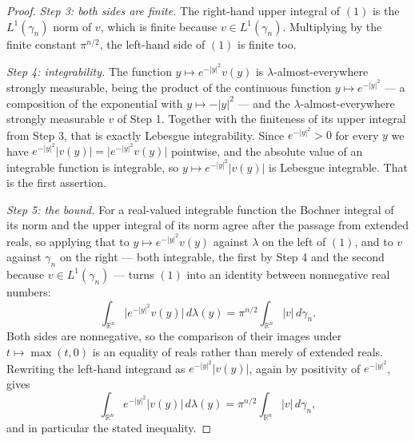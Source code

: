 \begin{proof}
\emph{Step 3: both sides are finite.}
The right-hand upper integral of $(1)$ is the $L^1(\gamma_n)$ norm of $v$, which
is finite because $v \in L^1(\gamma_n)$.  Multiplying by the finite constant
$\pi^{n/2}$, the left-hand side of $(1)$ is finite too.

\emph{Step 4: integrability.}
The function $y \mapsto e^{-|y|^2}v(y)$ is $\lambda$-almost-everywhere strongly
measurable, being the product of the continuous function $y \mapsto e^{-|y|^2}$
--- a composition of the exponential with $y \mapsto -|y|^2$ --- and the
$\lambda$-almost-everywhere strongly measurable $v$ of Step 1.  Together with the
finiteness of its upper integral from Step 3, that is exactly Lebesgue
integrability.  Since $e^{-|y|^2} > 0$ for every $y$ we have
$e^{-|y|^2}|v(y)| = \bigl|e^{-|y|^2}v(y)\bigr|$ pointwise, and the absolute value
of an integrable function is integrable, so $y \mapsto e^{-|y|^2}|v(y)|$ is
Lebesgue integrable.  That is the first assertion.

\emph{Step 5: the bound.}
For a real-valued integrable function the Bochner integral of its norm and the
upper integral of its norm agree after the passage from extended reals, so
applying that to $y \mapsto e^{-|y|^2}v(y)$ against $\lambda$ on the left of
$(1)$, and to $v$ against $\gamma_n$ on the right --- both integrable, the first
by Step 4 and the second because $v \in L^1(\gamma_n)$ --- turns $(1)$ into an
identity between nonnegative real numbers:
\[
  \int_{\mathbb{R}^n}\bigl|e^{-|y|^2}v(y)\bigr|\,d\lambda(y)
    = \pi^{n/2}\int_{\mathbb{R}^n}|v|\,d\gamma_n .
\]
Both sides are nonnegative, so the comparison of their images under
$t \mapsto \max(t,0)$ is an equality of reals rather than merely of extended
reals.  Rewriting the left-hand integrand as $e^{-|y|^2}|v(y)|$, again by
positivity of $e^{-|y|^2}$, gives
\[
  \int_{\mathbb{R}^n} e^{-|y|^2}|v(y)|\,d\lambda(y)
    = \pi^{n/2}\int_{\mathbb{R}^n}|v|\,d\gamma_n ,
\]
and in particular the stated inequality.
\end{proof}
